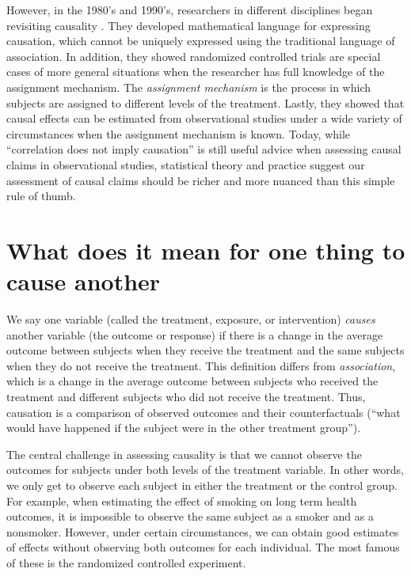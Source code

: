 \documentclass[
]{book}
\begin{document}
However, in the 1980's and 1990's, researchers in different disciplines began revisiting causality \citep{greenland1986identifiability, pearl1993bayesian, angrist1995identification}. They developed mathematical language for expressing causation, which cannot be uniquely expressed using the traditional language of association. In addition, they showed randomized controlled trials are special cases of more general situations when the researcher has full knowledge of the assignment mechanism. The \emph{assignment mechanism} is the process in which subjects are assigned to different levels of the treatment. Lastly, they showed that causal effects can be estimated from observational studies under a wide variety of circumstances when the assignment mechanism is known. Today, while ``correlation does not imply causation'' is still useful advice when assessing causal claims in observational studies, statistical theory and practice suggest our assessment of causal claims should be richer and more nuanced than this simple rule of thumb.

\hypertarget{what-does-it-mean-for-one-thing-to-cause-another}{%
\section{What does it mean for one thing to cause another}\label{what-does-it-mean-for-one-thing-to-cause-another}}

We say one variable (called the treatment, exposure, or intervention) \emph{causes} another variable (the outcome or response) if there is a change in the average outcome between subjects when they receive the treatment and the same subjects when they do not receive the treatment. This definition differs from \emph{association}, which is a change in the average outcome between subjects who received the treatment and different subjects who did not receive the treatment. Thus, causation is a comparison of observed outcomes and their counterfactuals (``what would have happened if the subject were in the other treatment group'').

The central challenge in assessing causality is that we cannot observe the outcomes for subjects under both levels of the treatment variable. In other words, we only get to observe each subject in either the treatment or the control group. For example, when estimating the effect of smoking on long term health outcomes, it is impossible to observe the same subject as a smoker and as a nonsmoker. However, under certain circumstances, we can obtain good estimates of effects without observing both outcomes for each individual. The most famous of these is the randomized controlled experiment.
\end{document}
